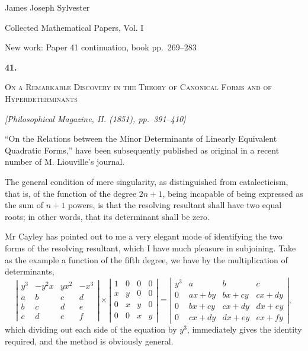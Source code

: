 \documentclass[11pt]{article}
\newcommand{\paperhead}[3]{%
  \clearpage
  \begin{center}
  {\Large\bfseries #1.}\par\vspace{0.85em}
  {\large\scshape #2}\par\vspace{0.6em}
  {\itshape [#3]}\par
  \end{center}\vspace{0.4em}}
\newcommand{\sourcepage}[1]{\marginpar{\scriptsize p.~#1}}
\begin{document}
\begin{center}
{\Large James Joseph Sylvester}\par\vspace{0.25em}
{\large Collected Mathematical Papers, Vol. I}\par\vspace{0.25em}
{\normalsize New work: Paper 41 continuation, book pp.~269--283}\par
\end{center}
\thispagestyle{empty}
\vspace{0.75em}

\paperhead{41}{On a Remarkable Discovery in the Theory of Canonical Forms and of Hyperdeterminants}{Philosophical Magazine, II. (1851), pp.~391--410}


\sourcepage{269}
``On the Relations between the Minor Determinants of Linearly Equivalent Quadratic Forms,'' have been subsequently published as original in a recent number of M. Liouville's journal.

The general condition of mere singularity, as distinguished from catalecticism, that is, of the function of the degree $2n+1$, being incapable of being expressed as the sum of $n+1$ powers, is that the resolving resultant shall have two equal roots; in other words, that its determinant shall be zero.

Mr Cayley has pointed out to me a very elegant mode of identifying the two forms of the resolving resultant, which I have much pleasure in subjoining. Take as the example a function of the fifth degree, we have by the multiplication of determinants,
\[
\left|\begin{array}{rrrr}
y^3&-y^2x&yx^2&-x^3\\
a&b&c&d\\
b&c&d&e\\
c&d&e&f
\end{array}\right|
\times
\left|\begin{array}{rrrr}
1&0&0&0\\
x&y&0&0\\
0&x&y&0\\
0&0&x&y
\end{array}\right|
=
\left|\begin{array}{rrrr}
y^3&a&b&c\\
0&ax+by&bx+cy&cx+dy\\
0&bx+cy&cx+dy&dx+ey\\
0&cx+dy&dx+ey&ex+fy
\end{array}\right|,
\]
which dividing out each side of the equation by $y^3$, immediately gives the identity required, and the method is obviously general.
\end{document}
